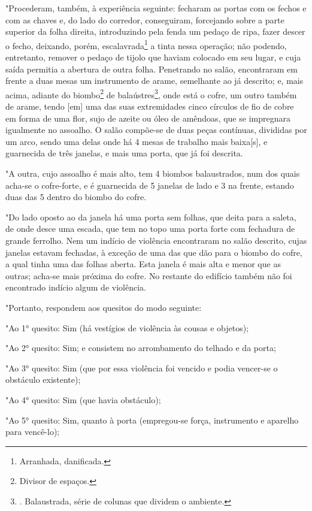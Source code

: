 "Procederam, também, à experiência seguinte: fecharam as portas com os
fechos e com as chaves e, do lado do corredor, conseguiram, forcejando
sobre a parte superior da folha direita, introduzindo pela fenda um
pedaço de ripa, fazer descer o fecho, deixando, porém,
escalavrada\footnote{Arranhada, danificada.} a tinta nessa operação; não
podendo, entretanto, remover o pedaço de tijolo que haviam colocado em
seu lugar, e cuja saída permitia a abertura de outra folha. Penetrando
no salão, encontraram em frente a duas mesas um instrumento de arame,
semelhante ao já descrito; e, mais acima, adiante do biombo\footnote{Divisor
  de espaços.} de balaústres\footnote{. Balaustrada, série de colunas
  que dividem o ambiente.}, onde está o cofre, um outro também de arame,
tendo {[}em{]} uma das suas extremidades cinco círculos de fio de cobre
em forma de uma flor, sujo de azeite ou óleo de amêndoas, que se
impregnara igualmente no assoalho. O salão compõe-se de duas peças
contínuas, divididas por um arco, sendo uma delas onde há 4 mesas de
trabalho mais baixa{[}s{]}, e guarnecida de três janelas, e mais uma
porta, que já foi descrita.

"A outra, cujo assoalho é mais alto, tem 4 biombos balaustrados, num dos
quais acha-se o cofre-forte, e é guarnecida de 5 janelas de lado e 3 na
frente, estando duas das 5 dentro do biombo do cofre.

"Do lado oposto ao da janela há uma porta sem folhas, que deita para a
saleta, de onde desce uma escada, que tem no topo uma porta forte com
fechadura de grande ferrolho. Nem um indício de violência encontraram no
salão descrito, cujas janelas estavam fechadas, à exceção de uma das que
dão para o biombo do cofre, a qual tinha uma das folhas aberta. Esta
janela é mais alta e menor que as outras; acha-se mais próxima do cofre.
No restante do edifício também não foi encontrado indício algum de
violência.

"Portanto, respondem aos quesitos do modo seguinte:

"Ao 1° quesito: Sim (há vestígios de violência às cousas e objetos);

"Ao 2° quesito: Sim; e consistem no arrombamento do telhado e da porta;

"Ao 3° quesito: Sim (que por essa violência foi vencido e podia
vencer-se o obstáculo existente);

"Ao 4° quesito: Sim (que havia obstáculo);

"Ao 5° quesito: Sim, quanto à porta (empregou-se força, instrumento e
aparelho para vencê-lo);

